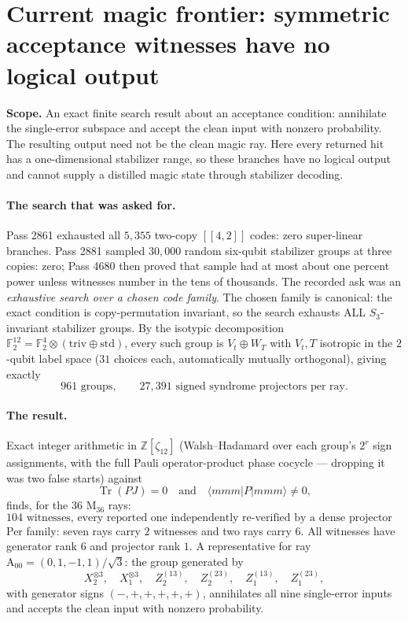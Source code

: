 \section*{Current magic frontier: symmetric acceptance witnesses have no logical output}

\noindent\textbf{Scope.}
An exact finite search result about an acceptance condition: annihilate the
single-error subspace and accept the clean input with nonzero probability.
The resulting output need not be the clean magic ray. Here every returned hit
has a one-dimensional stabilizer range, so these branches have no logical
output and cannot supply a distilled magic state through stabilizer decoding.

\paragraph{The search that was asked for.}
Pass 2861 exhausted all $5{,}355$ two-copy $[[4,2]]$ codes: zero super-linear branches.
Pass 2881 sampled $30{,}000$ random six-qubit stabilizer groups at three copies: zero;
Pass 4680 then proved that sample had at most about one percent power unless witnesses
number in the tens of thousands.  The recorded ask was an \emph{exhaustive search over
a chosen code family}.  The chosen family is canonical: the exact condition is
copy-permutation invariant, so the search exhausts ALL $S_3$-invariant stabilizer
groups.  By the isotypic decomposition $\mathbb{F}_2^{12}=\mathbb{F}_2^4\otimes(\mathrm{triv}\oplus
\mathrm{std})$, every such group is $V_t\oplus W_T$ with $V_t,T$ isotropic in the
$2$-qubit label space ($31$ choices each, automatically mutually orthogonal), giving
exactly
\[
961 \text{ groups},\qquad 27{,}391 \text{ signed syndrome projectors per ray}.
\]

\paragraph{The result.}
Exact integer arithmetic in $\mathbb{Z}[\zeta_{12}]$ (Walsh--Hadamard over each group's
$2^r$ sign assignments, with the full Pauli operator-product phase cocycle ---
dropping it was two false starts) against
\[
\operatorname{Tr}(PJ)=0
\quad\text{and}\quad
\langle mmm|P|mmm\rangle\neq 0 ,
\]
finds, for the $36$ $\mathrm{M}_{36}$ rays:
\[
\boxed{\text{104 witnesses, every reported one independently re-verified by a dense
projector construction on a separate code path.}}
\]
Per family: seven rays carry $2$ witnesses and two rays carry $6$. All witnesses
have generator rank $6$ and projector rank $1$. A representative for ray
$\mathrm{A}_{00}=(0,1,-1,1)/\sqrt3$:
the group generated by
\[
X_2^{\otimes 3},\quad X_1^{\otimes 3},\quad
Z_2^{(13)},\quad Z_2^{(23)},\quad Z_1^{(13)},\quad Z_1^{(23)},
\]
with generator signs $(-,+,+,+,+,+)$, annihilates all nine single-error inputs and
accepts the clean input with nonzero probability.

